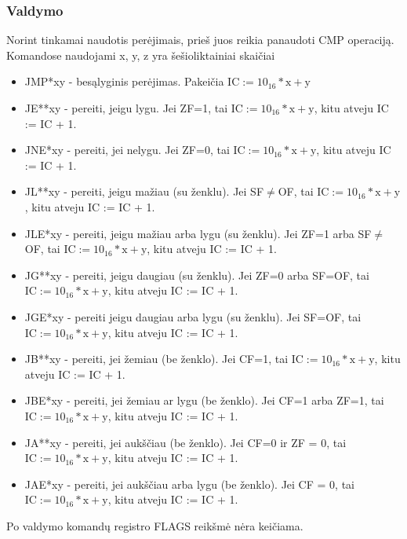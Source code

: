 \documentclass{VUMIFInfKursinis}
\begin{document}
\subsubsection{Valdymo}
Norint tinkamai naudotis perėjimais, prieš juos reikia panaudoti CMP operaciją. Komandose naudojami x, y, z yra šešioliktainiai skaičiai
\begin{itemize}
	\item JMP*xy - besąlyginis perėjimas. Pakeičia $ \text{IC} := 10_{16} * \text{x} + \text{y}$
	
	\item JE**xy - pereiti, jeigu lygu. Jei ZF=1, tai $ \text{IC} := 10_{16} * \text{x} + \text{y}$, kitu atveju IC := IC + 1.
	\item JNE*xy - pereiti, jei nelygu. Jei ZF=0, tai $ \text{IC} := 10_{16} * \text{x} + \text{y}$, kitu atveju IC := IC + 1.
	
	\item JL**xy - pereiti, jeigu mažiau (su ženklu). Jei SF$\neq$OF, tai $ \text{IC} := 10_{16} * \text{x} + \text{y}$, kitu atveju IC := IC + 1.
	\item JLE*xy - pereiti, jeigu mažiau arba lygu (su ženklu). Jei ZF=1 arba SF$\neq$OF, tai $ \text{IC} := 10_{16} * \text{x} + \text{y}$, kitu atveju IC := IC + 1.
	\item JG**xy - pereiti, jeigu daugiau (su ženklu). Jei ZF=0 arba SF=OF, tai $ \text{IC} := 10_{16} * \text{x} + \text{y}$, kitu atveju IC := IC + 1.
	\item JGE*xy - pereiti jeigu daugiau arba lygu (su ženklu). Jei SF=OF, tai $ \text{IC} := 10_{16} * \text{x} + \text{y}$, kitu atveju IC := IC + 1.
	
	\item JB**xy - pereiti, jei žemiau (be ženklo). Jei CF=1, tai $ \text{IC} := 10_{16} * \text{x} + \text{y}$, kitu atveju IC := IC + 1.
	\item JBE*xy - pereiti, jei žemiau ar lygu (be ženklo). Jei CF=1 arba ZF=1, tai $ \text{IC} := 10_{16} * \text{x} + \text{y}$, kitu atveju IC := IC + 1.
	\item JA**xy - pereiti, jei aukščiau (be ženklo). Jei CF=0 ir ZF = 0, tai $ \text{IC} := 10_{16} * \text{x} + \text{y}$, kitu atveju IC := IC + 1.
	\item JAE*xy - pereiti, jei aukščiau arba lygu (be ženklo). Jei CF = 0, tai $ \text{IC} := 10_{16} * \text{x} + \text{y}$, kitu atveju IC := IC + 1.
\end{itemize}

Po valdymo komandų registro FLAGS reikšmė nėra keičiama.
\end{document}

